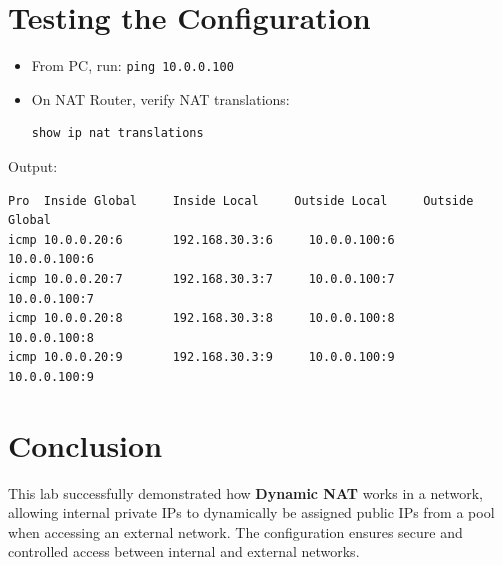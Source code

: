 \documentclass[12pt]{article}
\begin{document}
\section*{Testing the Configuration}
\begin{itemize}
    \item From PC, run: \texttt{ping 10.0.0.100}
    \item On NAT Router, verify NAT translations:
\begin{lstlisting}[language=bash]
show ip nat translations
\end{lstlisting}
\end{itemize}

\noindent Output:
\begin{verbatim}
Pro  Inside Global     Inside Local     Outside Local     Outside Global
icmp 10.0.0.20:6       192.168.30.3:6     10.0.0.100:6       10.0.0.100:6
icmp 10.0.0.20:7       192.168.30.3:7     10.0.0.100:7       10.0.0.100:7
icmp 10.0.0.20:8       192.168.30.3:8     10.0.0.100:8       10.0.0.100:8
icmp 10.0.0.20:9       192.168.30.3:9     10.0.0.100:9       10.0.0.100:9
\end{verbatim}

\section*{Conclusion}
This lab successfully demonstrated how \textbf{Dynamic NAT} works in a network, allowing internal private IPs to dynamically be assigned public IPs from a pool when accessing an external network. The configuration ensures secure and controlled access between internal and external networks.
\end{document}
